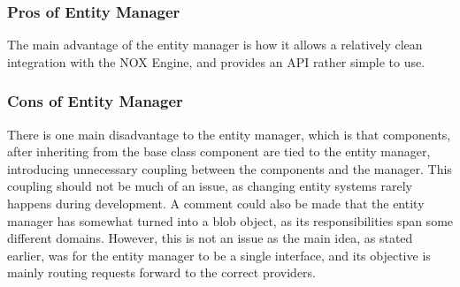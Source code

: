 \subsubsection{Pros of Entity Manager}
The main advantage of the entity manager is how it allows a relatively clean integration
with the NOX Engine, and provides an API rather simple to use.

\subsubsection{Cons of Entity Manager}
There is one main disadvantage to the entity manager, which is that components,
after inheriting from the base class component are tied to the entity manager, introducing
unnecessary coupling between the components and the manager. This coupling should not be much of an issue, as changing entity systems rarely happens during development.
A comment could also be made that the entity manager has somewhat turned into a blob object,
as its responsibilities span some different domains. However, this is not an issue
as the main idea, as stated earlier, was for the entity manager to be a single interface,
and its objective is mainly routing requests forward to the correct providers.